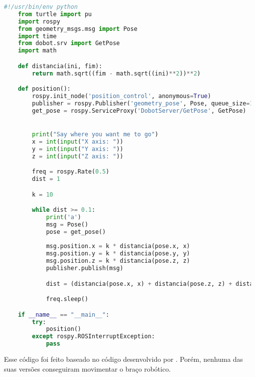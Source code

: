 \begin{lstlisting}[language=Python]
    #!/usr/bin/env python
    from turtle import pu
    import rospy
    from geometry_msgs.msg import Pose
    import time
    from dobot.srv import GetPose
    import math

    def distancia(ini, fim):
        return math.sqrt((fim - math.sqrt((ini)**2))**2)

    def position():
        rospy.init_node('position_control', anonymous=True)
        publisher = rospy.Publisher('geometry_pose', Pose, queue_size=10)
        get_pose = rospy.ServiceProxy('DobotServer/GetPose', GetPose)


        print("Say where you want me to go")
        x = int(input("X axis: "))
        y = int(input("Y axis: "))
        z = int(input("Z axis: "))

        freq = rospy.Rate(0.5)
        dist = 1

        k = 10

        while dist >= 0.1:
            print('a')
            msg = Pose()
            pose = get_pose()
            
            msg.position.x = k * distancia(pose.x, x)
            msg.position.y = k * distancia(pose.y, y)
            msg.position.z = k * distancia(pose.z, z)
            publisher.publish(msg)

            dist = (distancia(pose.x, x) + distancia(pose.z, z) + distancia(pose.y, y)) / 3

            freq.sleep()

    if __name__ == "__main__":
        try:
            position()
        except rospy.ROSInterruptException:
            pass
\end{lstlisting}

Esse código foi feito baseado no código desenvolvido por \cite{Dobotand76:online}. Porém, nenhuma das suas versões conseguiram movimentar o braço robótico.

